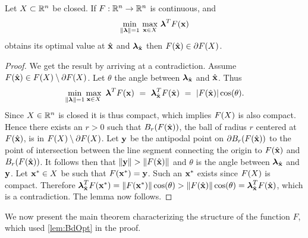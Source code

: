 \begin{lem} 
\label{lem:BdOpt}
Let $X\subset\mathbb{R}^n$ be closed. If $F:\mathbb{R}^n\rightarrow\mathbb{R}^n$ is continuous, and 
\[
\min\limits_{\lVert\boldsymbol{\lambda}\rVert=1} \, \max\limits_{\mathbf{x}\in X} \, \boldsymbol{\lambda}^TF(\mathbf{x})
\]
obtains its optimal value at $\hat{\mathbf{x}}$ and $\boldsymbol{\lambda}_{\hat{\mathbf{x}}}$ then $F(\hat{\mathbf{x}})\in \partial F(X)$. 


\begin{proof} 
  We get the result by arriving at a contradiction.
  Assume $F(\hat{\mathbf{x}})\in F(X)\setminus\partial F(X)$. 
  Let $\theta$ the angle between $\boldsymbol{\lambda}_{\hat{\mathbf{x}}}$ and $\hat{\mathbf{x}}$. 
  Thus
  \[
  \min\limits_{\lVert\boldsymbol{\lambda}\rVert=1}\max\limits_{\mathbf{x}\in X}\ \boldsymbol{\lambda}^TF(\mathbf{x}) ~=~ \boldsymbol{\lambda}_{\hat{\mathbf{x}}}^TF(\hat{\mathbf{x}}) ~=~ |F(\hat{\mathbf{x}})|\cos(\theta).
  \]
  Since $X\in\mathbb{R}^n$ is closed it is thus compact, which implies $F(X)$ is also compact. 
  Hence there exists an $r>0$ such that  $B_r(F(\hat{\mathbf{x}}))$, the ball of radius $r$ centered at $F(\hat{\mathbf{x}})$, is in $F(X)\setminus\partial F(X)$. 
  Let $\mathbf{y}$ be the antipodal point on $\partial B_r(F(\hat{\mathbf{x}}))$ to the point of intersection between the line segment connecting the origin to $F(\hat{\mathbf{x}})$ and $B_r(F(\hat{\mathbf{x}}))$. 
  It follows then that $\lVert\mathbf{y}\rVert>\lVert F(\hat{\mathbf{x}})\rVert$ and $\theta$ is the angle between $\boldsymbol{\lambda}_{\hat{\mathbf{x}}}$ and $\mathbf{y}$.   
  Let $\mathbf{x}^*\in X$ be such that $F(\mathbf{x}^*)=\mathbf{y}$.
  Such an $\mathbf{x}^*$ exists since $F(X)$ is compact. 
  Therefore $\boldsymbol{\lambda}_{\hat{\mathbf{x}}}^TF(\mathbf{x}^*)=\lVert F(\mathbf{x}^*)\rVert \cos(\theta) > \lVert F(\hat{\mathbf{x}})\rVert \cos(\theta) = \boldsymbol{\lambda}_{\hat{\mathbf{x}}}^TF(\hat{\mathbf{x}})$, which is a contradiction. 
  The lemma now follows.
\end{proof}
\end{lem}

\medskip
We now present the main theorem characterizing the structure of the function $F$, which used \cref{lem:BdOpt} in the proof.


